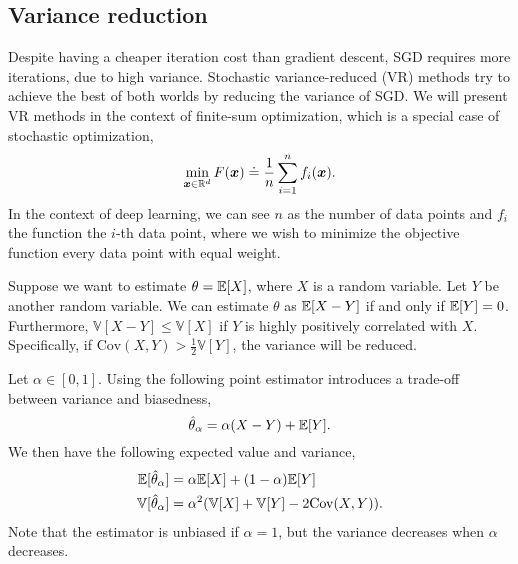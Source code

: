 \subsection{Variance reduction}

Despite having a cheaper iteration cost than gradient descent, SGD requires more iterations,
due to high variance. Stochastic variance-reduced (VR) methods try to achieve the best of both
worlds by reducing the variance of SGD. We will present VR methods in the context of finite-sum
optimization, which is a special case of stochastic optimization, \[
    \min_{\bm{x} \in \mathbb{R}^d} F(\bm{x}) \doteq \frac{1}{n} \sum_{i=1}^{n} f_i(\bm{x}).
\]
In the context of deep learning, we can see $n$ as the number of data points and $f_i$ the function
\wrt the $i$-th data point, where we wish to minimize the objective function \wrt every data point
with equal weight.

Suppose we want to estimate $\theta = \mathbb{E}[X]$, where $X$ is a random variable. Let $Y$ be another
random variable. We can estimate $\theta$ as $\mathbb{E}[X-Y]$ if and only if $\mathbb{E}[Y] = 0$. Furthermore,
$\mathbb{V}[X - Y] \leq \mathbb{V}[X]$ if $Y$ is highly positively correlated with $X$.
Specifically, if $\mathrm{Cov}(X, Y) > \frac{1}{2} \mathbb{V}[Y]$, the variance will be
reduced.

Let $\alpha \in [0,1]$. Using the following point estimator introduces a trade-off between variance
and biasedness, \[
    \hat{\theta}_{\alpha} = \alpha(X - Y) + \mathbb{E}[Y].
\]
We then have the following expected value and variance,
\begin{align*}
    \mathbb{E}[\hat{\theta}_{\alpha}]         & = \alpha \mathbb{E}[X] + (1 - \alpha) \mathbb{E}[Y]                                \\
    \mathbb{V}[\hat{\theta}_{\alpha}] & = \alpha^2 (\mathbb{V}[X] + \mathbb{V}[Y] - 2 \mathrm{Cov}(X, Y)).
\end{align*}
Note that the estimator is unbiased if $\alpha=1$, but the variance decreases when $\alpha$ decreases.

